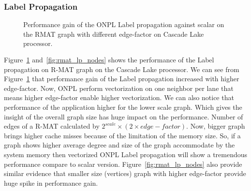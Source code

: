 \documentclass[default,iicol]{sn-jnl}%
\theoremstyle{thmstyleone}%
\theoremstyle{thmstyletwo}%
\theoremstyle{thmstylethree}%
\begin{document}
\subsubsection{Label Propagation}
\begin{figure}[hbt]
  		\centering
	\caption{Performance gain of the ONPL Label propagation against scalar on the RMAT graph with different edge-factor on Cascade Lake processor.}
  \label{fig:rmat_lp_ef}
\end{figure}
Figure~\ref{fig:rmat_lp_ef} and~\ref{fig:rmat_lp_nodes} shows the performance of the Label propagation on R-MAT graph on the 
Cascade Lake processor. We can see from Figure~\ref{fig:rmat_lp_ef} that performance gain of the Label propagation increased 
with higher edge-factor. Now, ONPL perform vectorization on one neighbor per lane that means higher edge-factor enable 
higher vectorization. We can also notice that performance of the application higher for the lower scale graph. Which gives the 
insight of the overall graph size has huge impact on the performance. Number of edges of a R-MAT calculated by 
$2^{scale}\times (2\times edge-factor)$.  Now, bigger graph brings higher cache misses because of the limitation of the memory size. 
So, if a graph shows higher average degree and size of the graph accommodate by the system memory then vectorized ONPL Label 
propagation will show a tremendous performance compare to scalar version. Figure~\ref{fig:rmat_lp_nodes} also provide 
similar evidence that smaller size (vertices) graph with higher edge-factor provide huge spike in performance gain.  
\end{document}
